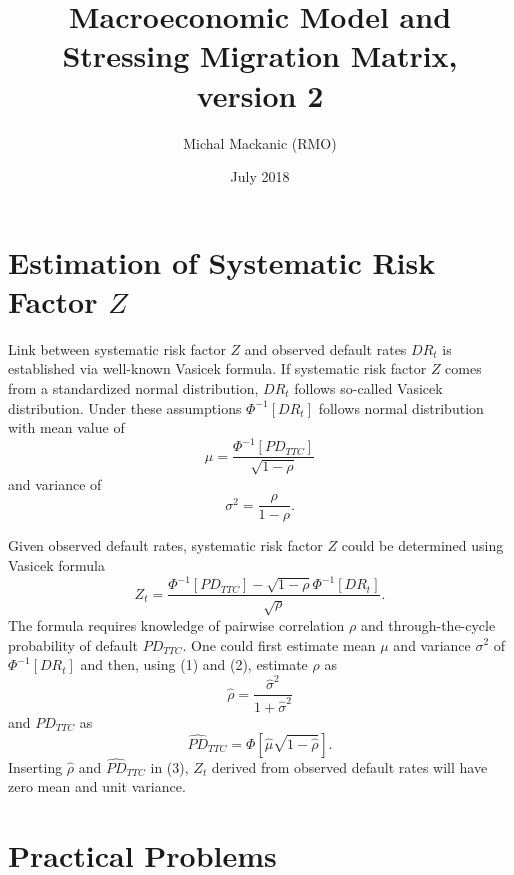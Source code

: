 \documentclass[a4paper]{article}
\begin{document}
\title{Macroeconomic Model and Stressing Migration Matrix, version 2}
\author{Michal Mackanic (RMO)}
\date{July 2018}
\maketitle

\tableofcontents{}

\section{Estimation of Systematic Risk Factor $Z$}

Link between systematic risk factor $Z$ and observed default rates $DR_t$ is established via well-known Vasicek formula. If systematic risk factor $Z$ comes from a standardized normal distribution, $DR_t$ follows so-called Vasicek distribution. Under these assumptions $\Phi^{-1}[DR_t]$ follows normal distribution with mean value of
\begin{equation}
\mu = \frac{\Phi^{-1}[PD_{TTC}]}{\sqrt{1-\rho}}
\end{equation}
and variance of
\begin{equation}
\sigma^2 = \frac{\rho}{1-\rho}.
\end{equation}

Given observed default rates, systematic risk factor $Z$ could be determined using Vasicek formula
\begin{equation}
Z_t = \frac{\Phi^{-1}[PD_{TTC}] - \sqrt{1 - \rho} \Phi^{-1}[DR_t]}{\sqrt{\rho}}.
\end{equation}
The formula requires knowledge of pairwise correlation $\rho$ and through-the-cycle probability of default $PD_{TTC}$. One could first estimate mean $\mu$ and variance $\sigma^2$ of $\Phi^{-1}[DR_t]$ and then, using (1) and (2), estimate $\rho$ as
\begin{equation}
\hat{\rho} = \frac{\hat{\sigma}^2}{1 + \hat{\sigma}^2}
\end{equation}
and $PD_{TTC}$ as
\begin{equation}
\widehat{PD}_{TTC} = \Phi[\hat{\mu}\sqrt{1 - \hat{\rho}}].
\end{equation}
Inserting $\hat{\rho}$ and $\widehat{PD}_{TTC}$ in (3), $Z_t$ derived from observed default rates will have zero mean and unit variance.

\section{Practical Problems}
\end{document}
